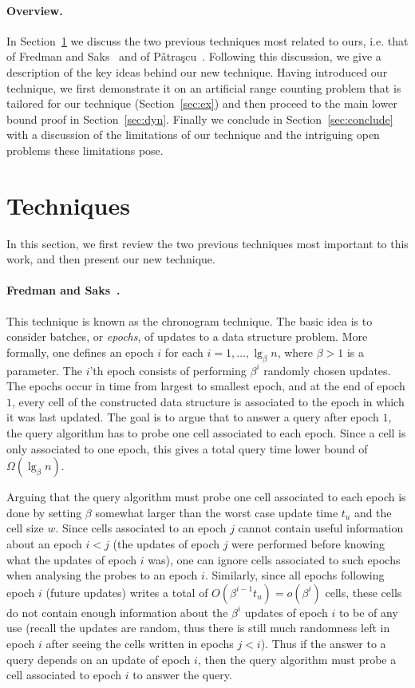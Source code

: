 \documentclass[letterpaper]{article}
\begin{document}
\paragraph{Overview.}
In Section~\ref{sec:tech} we discuss the two previous techniques most
related to ours, i.e. that of Fredman and Saks~\cite{Fredman:chrono}
and of P{\v a}tra{\c s}cu~\cite{patrascu07sum2D}. Following this
discussion, we give a description of the key ideas behind our new
technique. Having introduced our technique, we first demonstrate it on
an artificial range counting problem that is tailored for our
technique (Section~\ref{sec:ex}) and then proceed to the main lower
bound proof in Section~\ref{sec:dyn}. Finally we conclude in
Section~\ref{sec:conclude} with a discussion of the limitations of our
technique and the intriguing open problems these limitations pose.

\section{Techniques}
\label{sec:tech}
In this section, we first review the two previous techniques most
important to this work, and then present our new technique.

\paragraph{Fredman and Saks~\cite{Fredman:chrono}.} This technique is known as the chronogram technique. The basic idea is to consider batches, or \emph{epochs}, of updates to a data structure problem. More formally, one defines an epoch $i$ for each $i=1,\dots,\lg_\beta n$, where $\beta>1$ is a parameter. The $i$'th epoch consists of performing $\beta^i$ randomly chosen updates. The epochs occur in time from largest to smallest epoch, and at the end of epoch $1$, every cell of the constructed data structure is associated to the epoch in which it was last updated. The goal is to argue that to answer a query after epoch $1$, the query algorithm has to probe one cell associated to each epoch. Since a cell is only associated to one epoch, this gives a total query time lower bound of $\Omega(\lg_\beta n)$.

Arguing that the query algorithm must probe one cell associated to
each epoch is done by setting $\beta$ somewhat larger than the worst
case update time $t_u$ and the cell size $w$. Since cells associated
to an epoch $j$ cannot contain useful information about an epoch $i<j$
(the updates of epoch $j$ were performed before knowing what the
updates of epoch $i$ was), one can ignore cells associated to such
epochs when analysing the probes to an epoch $i$. Similarly, since all
epochs following epoch $i$ (future updates) writes a total of
$O(\beta^{i-1}t_u)=o(\beta^i)$ cells, these cells do not contain
enough information about the $\beta^i$ updates of epoch $i$ to be of
any use (recall the updates are random, thus there is still much
randomness left in epoch $i$ after seeing the cells written in epochs
$j<i$). Thus if the answer to a query depends on an update of epoch
$i$, then the query algorithm must probe a cell associated to epoch
$i$ to answer the query.
\end{document}
